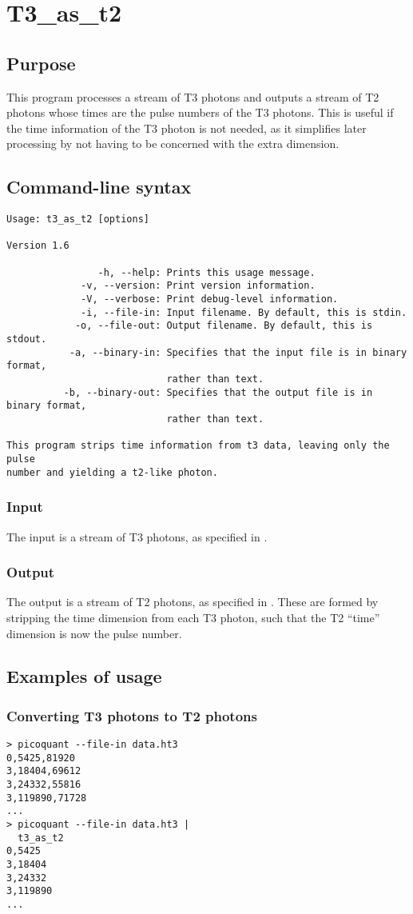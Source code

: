 \section{T3\_as\_t2}
\subsection{Purpose}
This program processes a stream of T3 photons and outputs a stream of T2 photons whose times are the pulse numbers of the T3 photons. This is useful if the time information of the T3 photon is not needed, as it simplifies later processing by not having to be concerned with the extra dimension.

\subsection{Command-line syntax}
\begin{verbatim}
Usage: t3_as_t2 [options]

Version 1.6

                -h, --help: Prints this usage message.
             -v, --version: Print version information.
             -V, --verbose: Print debug-level information.
             -i, --file-in: Input filename. By default, this is stdin.
            -o, --file-out: Output filename. By default, this is stdout.
           -a, --binary-in: Specifies that the input file is in binary format,
                            rather than text.
          -b, --binary-out: Specifies that the output file is in binary format,
                            rather than text.

This program strips time information from t3 data, leaving only the pulse
number and yielding a t2-like photon.
\end{verbatim}

\subsubsection{Input}
The input is a stream of T3 photons, as specified in .

\subsubsection{Output}
The output is a stream of T2 photons, as specified in . These are formed by stripping the time dimension from each T3 photon, such that the T2 ``time'' dimension is now the pulse number.

\subsection{Examples of usage}
\subsubsection{Converting T3 photons to T2 photons}
\begin{verbatim}
> picoquant --file-in data.ht3 
0,5425,81920
3,18404,69612
3,24332,55816
3,119890,71728
...
> picoquant --file-in data.ht3 |
  t3_as_t2
0,5425
3,18404
3,24332
3,119890
...
\end{verbatim}